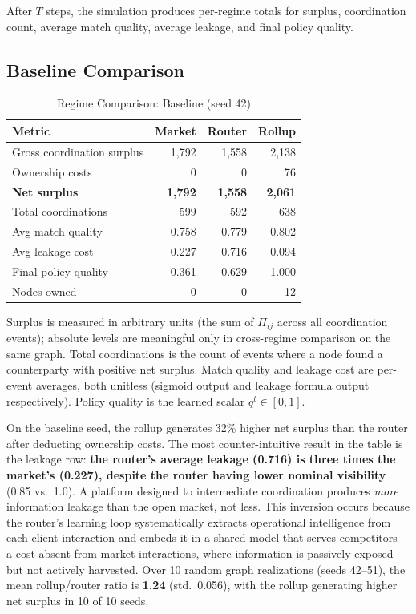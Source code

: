 \documentclass[12pt]{article}
\theoremstyle{definition}
\begin{document}
\noindent After $T$ steps, the simulation produces per-regime totals for surplus, coordination count, average match quality, average leakage, and final policy quality.

\subsection{Baseline Comparison}
\label{sec:baseline}

\begin{table}[H]
\centering
\caption{Regime Comparison: Baseline (seed 42)}
\label{tab:baseline}
\begin{tabular}{lrrr}
\toprule
Metric & Market & Router & Rollup \\
\midrule
Gross coordination surplus & 1,792 & 1,558 & 2,138 \\
Ownership costs & 0 & 0 & 76 \\
\textbf{Net surplus} & \textbf{1,792} & \textbf{1,558} & \textbf{2,061} \\
Total coordinations & 599 & 592 & 638 \\
Avg match quality & 0.758 & 0.779 & 0.802 \\
Avg leakage cost & 0.227 & 0.716 & 0.094 \\
Final policy quality & 0.361 & 0.629 & 1.000 \\
Nodes owned & 0 & 0 & 12 \\
\bottomrule
\end{tabular}
\end{table}

Surplus is measured in arbitrary units (the sum of $\Pi_{ij}$ across all coordination events); absolute levels are meaningful only in cross-regime comparison on the same graph. Total coordinations is the count of events where a node found a counterparty with positive net surplus. Match quality and leakage cost are per-event averages, both unitless (sigmoid output and leakage formula output respectively). Policy quality is the learned scalar $q^t \in [0,1]$.

On the baseline seed, the rollup generates 32\% higher net surplus than the router after deducting ownership costs. The most counter-intuitive result in the table is the leakage row: \textbf{the router's average leakage (0.716) is three times the market's (0.227), despite the router having lower nominal visibility} (0.85 vs.\ 1.0). A platform designed to intermediate coordination produces \textit{more} information leakage than the open market, not less. This inversion occurs because the router's learning loop systematically extracts operational intelligence from each client interaction and embeds it in a shared model that serves competitors---a cost absent from market interactions, where information is passively exposed but not actively harvested. Over 10 random graph realizations (seeds 42--51), the mean rollup/router ratio is \textbf{1.24} (std.\ 0.056), with the rollup generating higher net surplus in 10 of 10 seeds.
\end{document}
